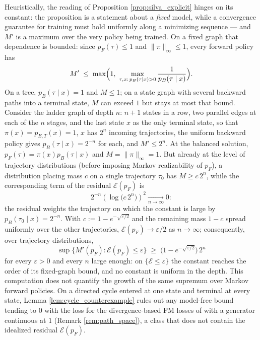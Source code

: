 \begin{remark}\label{rem:silva_model_constant}
Heuristically, the reading of Proposition \ref{prop:silva_explicit} hinges on its constant: the proposition is a statement about a \emph{fixed} model, while a convergence guarantee for training must hold uniformly along a minimizing sequence --- and $M'$ is a maximum over the very policy being trained. On a fixed graph that dependence is bounded: since $p_F(\tau)\leq1$ and $\|\pi\|_\infty\leq1$, every forward policy has
\begin{equation}
    M' \;\leq\; \max\Bigl(1,\ \max_{\tau,x:\,p_B(\tau\mid x)>0}\frac{1}{p_B(\tau\mid x)}\Bigr).
\end{equation}
On a tree, $p_B(\tau\mid x)=1$ and $M\leq1$; on a state graph with several backward paths into a terminal state, $M$ can exceed $1$ but stays at most that bound. Consider the ladder graph of depth $n$: $n+1$ states in a row, two parallel edges at each of the $n$ stages, and the last state $x$ as the only terminal state, so that $\pi(x)=p_{E,T}(x)=1$, $x$ has $2^{n}$ incoming trajectories, the uniform backward policy gives $p_B(\tau\mid x)=2^{-n}$ for each, and $M'\leq 2^{n}$. At the balanced solution, $p_F(\tau)=\pi(x)p_B(\tau\mid x)$ and $M=\|\pi\|_\infty=1$. But already at the level of trajectory distributions (before imposing Markov realizability of $p_F$), a distribution placing mass $c$ on a single trajectory $\tau_0$ has $M \geq c\,2^{n}$, while the corresponding term of the residual $\mathcal E(p_F)$ is
\begin{equation}
    2^{-n}\left(\log\bigl(c\,2^{n}\bigr)\right)^{2} \xrightarrow[n\rightarrow\infty]{} 0:
\end{equation}
the residual weights the trajectory on which the constant is large by $p_B(\tau_0\mid x)=2^{-n}$. With $c:=1-e^{-\sqrt{\varepsilon/2}}$ and the remaining mass $1-c$ spread uniformly over the other trajectories, $\mathcal E(p_F)\rightarrow\varepsilon/2$ as $n\rightarrow\infty$; consequently, over trajectory distributions,
\begin{equation}
    \sup\{M'(p_F) : \mathcal E(p_F)\leq\varepsilon\} \;\geq\; \bigl(1-e^{-\sqrt{\varepsilon/2}}\bigr)\,2^{n}
\end{equation}
for every $\varepsilon>0$ and every $n$ large enough: on $\{\mathcal E\leq\varepsilon\}$ the constant reaches the order of its fixed-graph bound, and no constant is uniform in the depth. This computation does not quantify the growth of the same supremum over Markov forward policies. On a directed cycle entered at one state and terminal at every state, Lemma \ref{lem:cycle_counterexample} rules out any model-free bound tending to $0$ with the loss for the divergence-based FM losses of \citet{brunswic2024theory} with a generator continuous at $1$ (Remark \ref{rem:path_space}), a class that does not contain the idealized residual $\mathcal E(p_F)$.
\end{remark}

